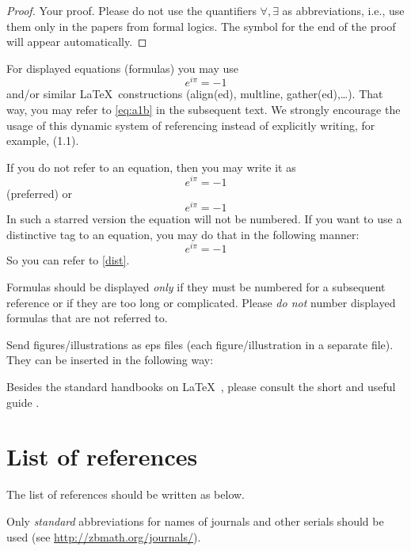 \documentclass[a4paper,draft]{amsproc}
\theoremstyle{plain}
\theoremstyle{definition}
\theoremstyle{remark}
\numberwithin{equation}{section}
\begin{document}
\begin{proof}
Your proof.
Please do not use the quantifiers $\forall,\exists$ as abbreviations,
i.e., use them only in the papers from formal logics.
The symbol for the end of the proof will appear automatically.
\end{proof}

For displayed equations (formulas) you may use
\begin{equation}\label{eq:a1b}
e^{i\pi}=-1
\end{equation}
and/or similar \LaTeX\ constructions (align(ed), multline, gather(ed),\dots).
That way, you may refer to \eqref{eq:a1b} in the subsequent text.
We strongly encourage the usage of this dynamic system of referencing
instead of explicitly writing, for example, (1.1).

If you do not refer to an equation, then you may write it as
\[
e^{i\pi}=-1
\]
(preferred) or
\begin{equation*}
e^{i\pi}=-1
\end{equation*}
In such a starred version the equation will not be numbered.
If you want to use a distinctive tag to an equation,
you may do that in the following manner:
\begin{equation}\label{dist}
e^{i\pi}=-1
\tag{*}
\end{equation}
So you can refer to \eqref{dist}.

Formulas should be displayed \emph{only}
if they must be numbered for a subsequent reference
or if they are too long or complicated.
Please \emph{do not} number displayed formulas that are not referred to.

Send figures/illustrations as eps files (each figure/illustration in a separate file).
They can be inserted in the following way:

\begin{figure}[htb]
\caption{}
\label{some label}
\end{figure}

Besides the standard handbooks on \LaTeX\ \cite{Gr,Lmp,Lbible},
please consult the short and useful guide \cite{TrzG}.


\section{List of references}

The list of references should be written as below.

Only \emph{standard} abbreviations for names of journals and other serials
should be used (see \url{http://zbmath.org/journals/}).
\end{document}
